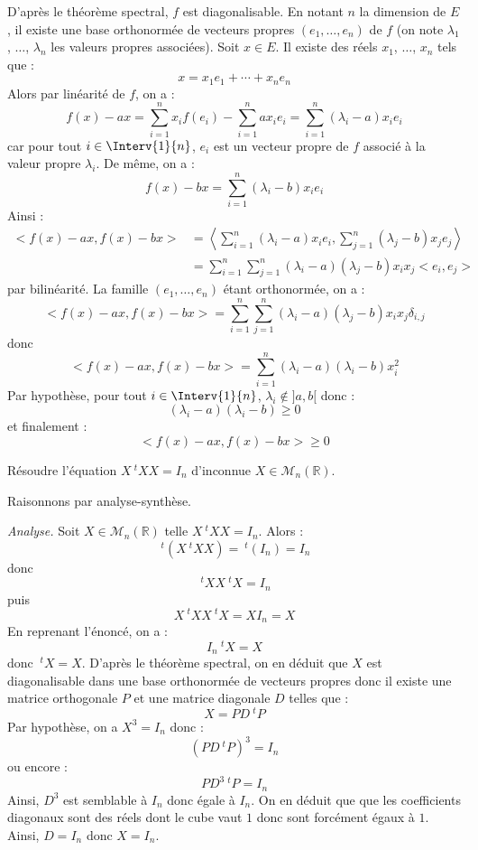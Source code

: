 \documentclass[a4paper,10pt]{report}
\begin{document}
\corr D'après le théorème spectral, $f$ est diagonalisable. En notant $n$ la dimension de $E$, il existe une base orthonormée de vecteurs propres $(e_1, \ldots, e_n)$ de $f$ (on note $\lambda_1$, $\ldots$, $\lambda_n$ les valeurs propres associées). Soit $x \in E$. Il existe des réels $x_1$, $\ldots$, $x_n$ tels que :
$$ x=  x_1 e_1 + \cdots +  x_n e_n$$ 
Alors par linéarité de $f$, on a :
$$ f(x)-ax = \sum_{i=1}^n x_i f(e_i) - \sum_{i=1}^n  a x_i e_i =  \sum_{i=1}^n (\lambda_i-a) x_i  e_i $$
car pour tout $i \in \Interv{1}{n}$, $e_i$ est un vecteur propre de $f$ associé à la valeur propre $\lambda_i$. De même, on a :
$$ f(x)-bx = \sum_{i=1}^n (\lambda_i-b) x_i  e_i $$
Ainsi :
\begin{align*}
<f(x)-ax,f(x)-bx> & = \left< \sum_{i=1}^n (\lambda_i-a) x_i  e_i , \sum_{j=1}^n (\lambda_j-b) x_j  e_j \right> \\
& = \sum_{i=1}^n \sum_{j=1}^n (\lambda_i - a)(\lambda_j-b) x_i x_j <e_i,e_j> 
\end{align*}
par bilinéarité. La famille $(e_1, \ldots, e_n)$ étant orthonormée, on a :
$$ <f(x)-ax,f(x)-bx> = \sum_{i=1}^n \sum_{j=1}^n (\lambda_i - a)(\lambda_j-b) x_i x_j \delta_{i,j}$$
donc
$$ <f(x)-ax,f(x)-bx> = \sum_{i=1}^n (\lambda_i - a)(\lambda_i-b) x_i^2$$
Par hypothèse, pour tout $i \in \Interv{1}{n}$, $\lambda_i \notin ]a,b[$ donc :
$$ (\lambda_i - a)(\lambda_i-b) \geq 0$$
et finalement :
$$ <f(x)-ax,f(x)-bx> \geq 0$$

\begin{Exercice}{} Résoudre l'équation $X ~^tX X= I_n$ d'inconnue $X \in \mathcal{M}_n(\mathbb{R})$.
\end{Exercice}

\corr Raisonnons par analyse-synthèse.

\medskip

\noindent \textit{Analyse.} Soit $X \in \mathcal{M}_n(\mathbb{R})$ telle $X ~^tX X= I_n$. Alors :
$$ ~^t (X ~^tX X) =  ~^t(I_n)= I_n$$
donc
$$ ~^tX X ~^tX = I_n$$
puis
$$ X  ~^tX X ~^tX = X I_n= X$$
En reprenant l'énoncé, on a :
$$ I_n ~^tX = X$$
donc $~^tX = X$. D'après le théorème spectral, on en déduit que $X$ est diagonalisable dans une base orthonormée de vecteurs propres donc il existe une matrice orthogonale $P$ et une matrice diagonale $D$ telles que :
$$ X = PD ~^tP$$
Par hypothèse, on a $X^3=I_n$ donc :
$$ (PD ~^tP)^3= I_n$$
ou encore :
$$ PD^3 ~^tP=I_n$$
Ainsi, $D^3$ est semblable à $I_n$ donc égale à $I_n$. On en déduit que que les coefficients diagonaux sont des réels dont le cube vaut $1$ donc sont forcément égaux à $1$. Ainsi, $D=I_n$ donc $X=I_n$.
\end{document}
